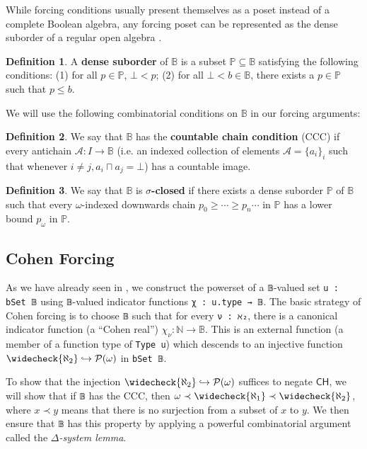 \documentclass[sigplan,screen]{acmart}
\newcommand{\B}{\mathbb{B}}
\newcommand{\lil}{\lstinline}
\newcommand{\N}{\mathbb{N}}
\newcommand{\CH}{\mathsf{CH}}
\theoremstyle{definition}
\newtheorem{defn}{Definition}[section]
\begin{document}
While forcing conditions usually present themselves as a poset instead of a complete Boolean algebra, any forcing poset can be represented as the dense suborder of a regular open algebra \cite{moore2019method}.

\begin{defn}\label{def:dense-suborder}
  A \textbf{dense suborder} of \(\B\) is a subset \(\mathbb{P} \subseteq \B\) satisfying the following conditions: (1) for all \(p \in \mathbb{P}\), \(\bot < p\); (2) for all \(\bot < b \in \B\), there exists a \(p \in \mathbb{P}\) such that \(p \leq b\).
\end{defn}

We will use the following combinatorial conditions on \(\mathbb{B}\) in our forcing arguments:

\begin{defn}\label{def:ccc}
We say that $\B$ has the \textbf{countable chain condition} (CCC) if every antichain $\mathcal{A} : I \to \B$ (i.e. an indexed collection of elements $\mathcal{A} = \{a_i\}_i$ such that whenever $i \neq j, a_i \sqcap a_j = \bot$) has a countable image.
\end{defn}

\begin{defn}\label{def:sigma-closed}
We say that \(\B\) is \textbf{\(\sigma\)-closed} if there exists a dense suborder \(\mathbb{P}\) of \(\B\) such that every \(\omega\)-indexed downwards chain \(p_0 \geq \cdots \geq p_n \cdots\) in \(\mathbb{P}\) has a lower bound \(p_{\omega}\) in \(\mathbb{P}\).
\end{defn}

\subsection{Cohen Forcing}

As we have already seen in , we construct the powerset of a \lil{𝔹}-valued set \lstinline{u : bSet 𝔹} using \lil{𝔹}-valued indicator functions \lil{χ : u.type → 𝔹}.
The basic strategy of Cohen forcing is to choose \lil{𝔹} such that for every \lil{ν : ℵ₂}, there is a canonical indicator function (a ``Cohen real'') \(\chi_{\nu} : \N \to \mathbb{B}\).
This is an external function (a member of a function type of \lstinline{Type u}) which descends to an injective function \(\widecheck{\aleph_2} \hookrightarrow \mathcal{P}(\omega)\) in \lil{bSet 𝔹}.

To show that the injection \(\widecheck{\aleph_2} \hookrightarrow \mathcal{P}(\omega)\)  suffices to negate \(\CH\), we will show that if \lil{𝔹} has the CCC, then \(\omega \prec \widecheck{\aleph_1} \prec \widecheck{\aleph_2}\), where $x\prec y$ means that there is no surjection from a subset of $x$ to $y$. We then ensure that \lil{𝔹} has this property by applying a powerful combinatorial argument called the \emph{\(\Delta\)-system lemma}.
\end{document}
